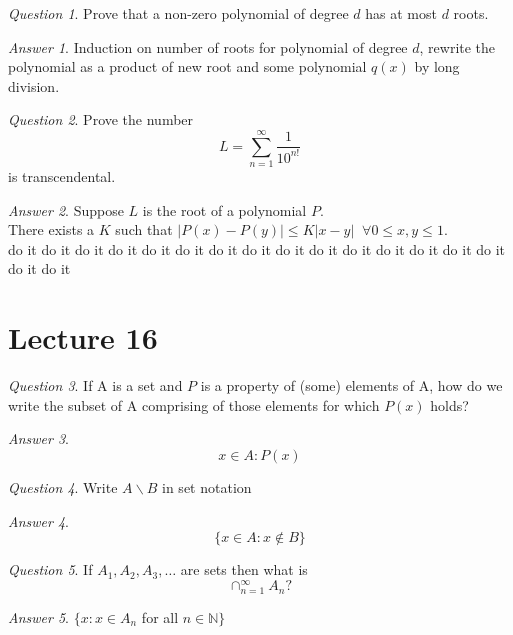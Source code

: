 \documentclass[]{article}
\def\naturals{\mathbb{N}}
\theoremstyle{remark}
\theoremstyle{qnstyle}
\newtheorem{question}{Question}
\theoremstyle{answerstyle}
\newtheorem*{answer}{Answer}
\begin{document}
\begin{question}
    Prove that a non-zero polynomial of degree $d$ has at most $d$ roots.
\end{question}
\begin{answer}
    Induction on number of roots for polynomial of degree $d$, rewrite the polynomial
    as a product of new root and some polynomial $q(x)$ by long division.
\end{answer}

\begin{question}
    Prove the number 
        $$L = \sum_{n=1}^{\infty}{\frac{1}{10^{n!}}}$$
    is transcendental.
\end{question}
\begin{answer}
    Suppose $L$ is the root of a polynomial $P$. \\
    There exists a $K$ such that $|P(x) - P(y)| \leq K|x - y| \;\;
    \forall 0 \leq x,y \leq 1$. \\
    do it do it do it do it do it do it do it do it do it do it do it do it do it do it do it do it do it
\end{answer}





\section* {Lecture 16}

\begin{question}
    If A is a set and $P$ is a property of (some) elements of A, 
    how do we write the subset of A comprising of those elements 
    for which $P(x)$ holds?
\end{question}
\begin{answer}
    $${x \in A: P(x)}$$
\end{answer}

\begin{question}
    Write $A \backslash B$ in set notation
\end{question}
\begin{answer}
    $$\{ x \in A: x \not \in B\}$$
\end{answer}

\begin{question}
    If $A_1, A_2, A_3, \ldots$ are sets then what is 
        $$\cap_{n=1}^\infty A_n?$$
\end{question}
\begin{answer}
    $\{x: x \in A_n$ for all $n \in \naturals \}$
\end{answer}
\end{document}
